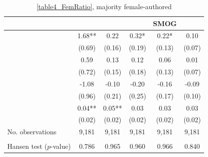 \begin{table}
    \footnotesize
    \centering
    \begin{threeparttable}
        \caption{\autoref{table4_FemRatio}, majority female-authored}
        \label{table4_Fem50}
        \begin{tabular}{p{4cm}S@{}S@{}S@{}S@{}S@{}}
            \toprule
            &{}&{}&{}&{SMOG}&{}\\
            \midrule
            &        1.68** &        0.22   &        0.32*  &        0.22*  &        0.10   \\
                                          &      {(0.69)}   &      {(0.16)}   &      {(0.19)}   &      {(0.13)}   &      {(0.07)}   \\
            &        0.59   &        0.13   &        0.12   &        0.06   &        0.01   \\
                                          &      {(0.72)}   &      {(0.15)}   &      {(0.18)}   &      {(0.13)}   &      {(0.07)}   \\
            &       -1.08   &       -0.10   &       -0.20   &       -0.16   &       -0.09   \\
                                          &      {(0.96)}   &      {(0.21)}   &      {(0.25)}   &      {(0.17)}   &      {(0.10)}   \\
            &        0.04** &        0.05** &        0.03   &        0.03   &        0.03   \\
                                          &      {(0.02)}   &      {(0.02)}   &      {(0.02)}   &      {(0.02)}   &      {(0.02)}   \\
            \midrule
            No. observations      &       9,181   &       9,181   &       9,181   &       9,181   &       9,181   \\
             \\\quad Hansen test (\(p\)-value)&       0.786   &       0.965   &       0.960   &       0.966   &       0.840   \\

\end{tabular}
\end{threeparttable}
\end{table}

